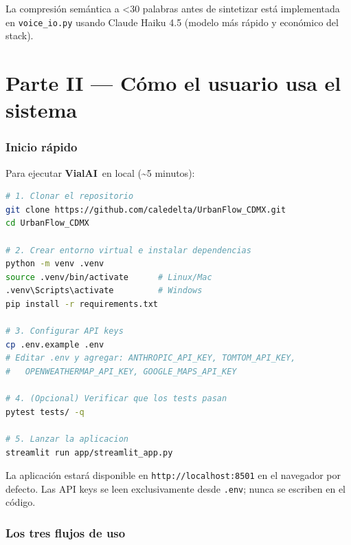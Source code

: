\documentclass[11pt,a4paper]{article}
\newcommand{\VialAI}{\textbf{\textcolor{vialTeal}{Vial}\textcolor{vialAmber}{AI}}}
\begin{document}
La compresión semántica a \textless 30 palabras antes de sintetizar
está implementada en \texttt{voice\_io.py} usando Claude Haiku 4.5
(modelo más rápido y económico del stack).


\newpage
\part*{Parte II — Cómo el usuario usa el sistema}

\section{Inicio rápido}

Para ejecutar \VialAI\ en local (\textasciitilde 5 minutos):

\begin{lstlisting}[language=bash, caption={Instalación y ejecución de VialAI.}]
# 1. Clonar el repositorio
git clone https://github.com/caledelta/UrbanFlow_CDMX.git
cd UrbanFlow_CDMX

# 2. Crear entorno virtual e instalar dependencias
python -m venv .venv
source .venv/bin/activate      # Linux/Mac
.venv\Scripts\activate         # Windows
pip install -r requirements.txt

# 3. Configurar API keys
cp .env.example .env
# Editar .env y agregar: ANTHROPIC_API_KEY, TOMTOM_API_KEY,
#   OPENWEATHERMAP_API_KEY, GOOGLE_MAPS_API_KEY

# 4. (Opcional) Verificar que los tests pasan
pytest tests/ -q

# 5. Lanzar la aplicacion
streamlit run app/streamlit_app.py
\end{lstlisting}

La aplicación estará disponible en \texttt{http://localhost:8501} en el
navegador por defecto. Las API keys se leen exclusivamente desde
\texttt{.env}; nunca se escriben en el código.

\section{Los tres flujos de uso}
\end{document}

